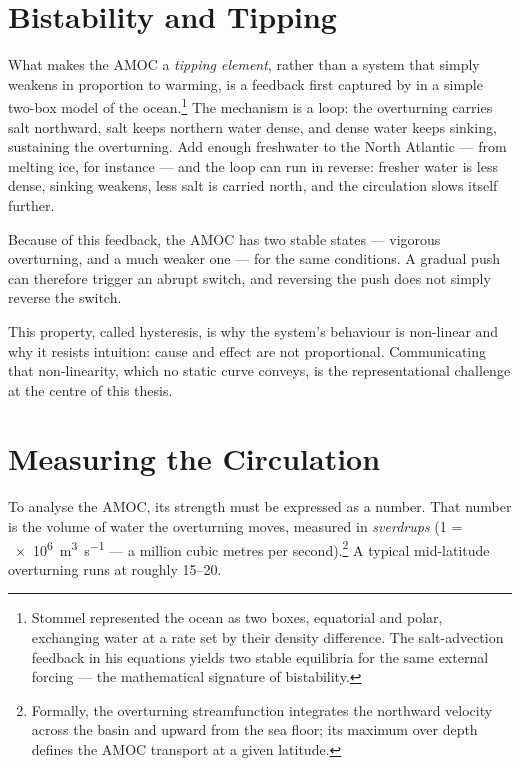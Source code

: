 \section{Bistability and Tipping}
\label{sec:bg-bistability}

What makes the AMOC a \emph{tipping element}, rather than a system that simply weakens in proportion to warming, is a feedback first captured by \citet{stommel1961} in a simple two-box model of the ocean.\footnote{Stommel represented the ocean as two boxes, equatorial and polar, exchanging water at a rate set by their density difference. The salt-advection feedback in his equations yields two stable equilibria for the same external forcing --- the mathematical signature of bistability.} The mechanism is a loop: the overturning carries salt northward, salt keeps northern water dense, and dense water keeps sinking, sustaining the overturning. Add enough freshwater to the North Atlantic --- from melting ice, for instance --- and the loop can run in reverse: fresher water is less dense, sinking weakens, less salt is carried north, and the circulation slows itself further.

Because of this feedback, the AMOC has two stable states --- vigorous overturning, and a much weaker one --- for the same conditions. A gradual push can therefore trigger an abrupt switch, and reversing the push does not simply reverse the switch.

This property, called hysteresis, is why the system's behaviour is non-linear and why it resists intuition: cause and effect are not proportional. Communicating that non-linearity, which no static curve conveys, is the representational challenge at the centre of this thesis.

\section{Measuring the Circulation}
\label{sec:bg-measurement}

To analyse the AMOC, its strength must be expressed as a number. That number is the volume of water the overturning moves, measured in \emph{sverdrups} (\SI{1}{\sverdrup} = \SI{e6}{\cubic\metre\per\second} --- a million cubic metres per second).\footnote{Formally, the overturning streamfunction integrates the northward velocity across the basin and upward from the sea floor; its maximum over depth defines the AMOC transport at a given latitude.} A typical mid-latitude overturning runs at roughly \SIrange{15}{20}{\sverdrup}.

